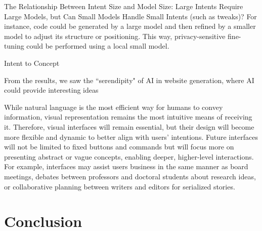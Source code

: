 The Relationship Between Intent Size and Model Size: Large Intents Require Large Models, but Can Small Models Handle Small Intents (such as tweaks)?
For instance, code could be generated by a large model and then refined by a smaller model to adjust its structure or positioning. This way, privacy-sensitive fine-tuning could be performed using a local small model.

Intent to Concept

From the results, we saw the ``serendipity" of AI in website generation, where AI could provide interesting ideas

While natural language is the most efficient way for humans to convey information, visual representation remains the most intuitive means of receiving it. Therefore, visual interfaces will remain essential, but their design will become more flexible and dynamic to better align with users' intentions. Future interfaces will not be limited to fixed buttons and commands but will focus more on presenting abstract or vague concepts, enabling deeper, higher-level interactions. For example, interfaces may assist users business in the same manner as board meetings, debates between professors and doctoral students about research ideas, or collaborative planning between writers and editors for serialized stories.

\section{Conclusion}